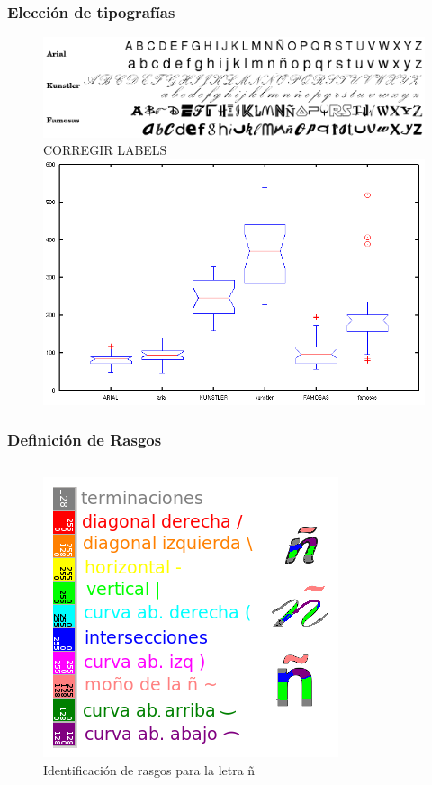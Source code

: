 \documentclass[10pt]{beamer}
\begin{document}
	\begin{frame}
	\frametitle{Elecci\'on de tipograf\'ias}
	    \begin{figure}
		\includegraphics[width=\textwidth]{graficos/letras.png}\\ \pause
		\alert{CORREGIR LABELS}
		\includegraphics[width=0.8\textheight]{graficos/complejidadesBoxplot.png}
	    \end{figure}
	\end{frame}

	\begin{frame}
	\frametitle{Definici\'on de Rasgos}
	\begin{columns} [t]
	      \column{1\textwidth}
	      \begin{figure}
		  \includegraphics[height=.7\textheight]{graficos/REFERENCIA.png}
		  \caption{Identificaci\'on de rasgos para la letra \~n}
		  \end{figure}
	\end{columns}
	\end{frame}
\end{document}
